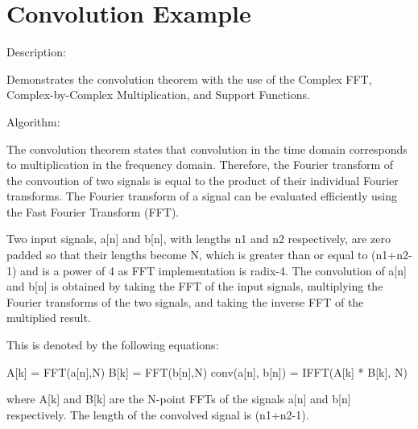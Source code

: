 \hypertarget{group___convolution_example}{\section{Convolution Example}
\label{group___convolution_example}
}
\begin{DoxyParagraph}{Description\-: }

\end{DoxyParagraph}
\begin{DoxyParagraph}{}
Demonstrates the convolution theorem with the use of the Complex F\-F\-T, Complex-\/by-\/\-Complex Multiplication, and Support Functions.
\end{DoxyParagraph}
\begin{DoxyParagraph}{Algorithm\-:}

\end{DoxyParagraph}
\begin{DoxyParagraph}{}
The convolution theorem states that convolution in the time domain corresponds to multiplication in the frequency domain. Therefore, the Fourier transform of the convoution of two signals is equal to the product of their individual Fourier transforms. The Fourier transform of a signal can be evaluated efficiently using the Fast Fourier Transform (F\-F\-T). 
\end{DoxyParagraph}
\begin{DoxyParagraph}{}
Two input signals, {\ttfamily a\mbox{[}n\mbox{]}} and {\ttfamily b\mbox{[}n\mbox{]}}, with lengths {\ttfamily n1} and {\ttfamily n2} respectively, are zero padded so that their lengths become {\ttfamily N}, which is greater than or equal to {\ttfamily (n1+n2-\/1)} and is a power of 4 as F\-F\-T implementation is radix-\/4. The convolution of {\ttfamily a\mbox{[}n\mbox{]}} and {\ttfamily b\mbox{[}n\mbox{]}} is obtained by taking the F\-F\-T of the input signals, multiplying the Fourier transforms of the two signals, and taking the inverse F\-F\-T of the multiplied result. 
\end{DoxyParagraph}
\begin{DoxyParagraph}{}
This is denoted by the following equations\-: 
\begin{DoxyPre} A[k] = FFT(a[n],N)
B[k] = FFT(b[n],N)
conv(a[n], b[n]) = IFFT(A[k] * B[k], N)\end{DoxyPre}
 where {\ttfamily A\mbox{[}k\mbox{]}} and {\ttfamily B\mbox{[}k\mbox{]}} are the N-\/point F\-F\-Ts of the signals {\ttfamily a\mbox{[}n\mbox{]}} and {\ttfamily b\mbox{[}n\mbox{]}} respectively. The length of the convolved signal is {\ttfamily (n1+n2-\/1)}.
\end{DoxyParagraph}
